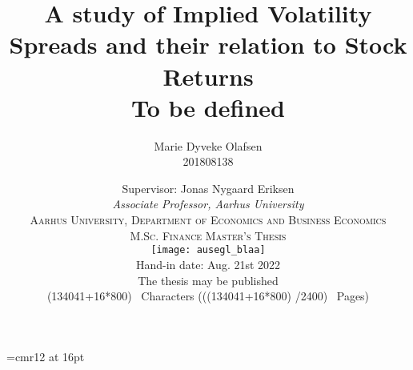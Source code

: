 \font\myfont=cmr12 at 16pt

\newcommand\charactersnofigs{134041}
\newcommand\figstables{16}
\newcommand\charspertable{800}
\newcommand\charsperpage{2400}
\newcommand\characterstotal{\the\numexpr(\charactersnofigs+\figstables*\charspertable)  \relax}
\newcommand\pagestotal{\the\numexpr(\characterstotal/\charsperpage)  \relax}

\title{
   {A study of Implied Volatility Spreads and their relation to Stock Returns} \\
    \large{To be defined}
	}
    \date{\bigskip Supervisor: Jonas Nygaard Eriksen \\ [-0.2em]
	\textit{Associate Professor, Aarhus University} \\
	\bigskip \bigskip
	\textsc{Aarhus University, Department of Economics and Business Economics} \\
	\textsc{M.Sc. Finance Master's Thesis}	\\
	\bigskip \bigskip
	\protect	\texttt{[image: ausegl\_blaa]} \\
	\bigskip
	Hand-in date: Aug. 21st 2022\\ 
	The thesis may be published \\
	\characterstotal\ Characters (\pagestotal\ Pages)  \\	\bigskip \bigskip  }
	
	\author{
	Marie Dyveke Olafsen \\ [-0.2em]
	201808138
	}
\maketitle
\thispagestyle{empty}